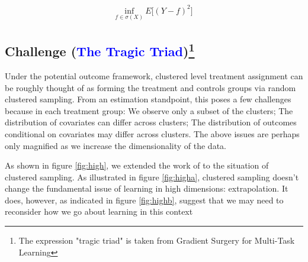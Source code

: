 \documentclass[a4paper,12pt]{article}
\begin{document}
\begin{align*}
    \underset{f \in \sigma(X)}{\text{inf}} \ E\big[(Y - f)^2\big]
\end{align*}
 

\subsection{Challenge (\textcolor{blue}{The Tragic Triad})\footnote{The expression "tragic triad" is taken from Gradient Surgery for Multi-Task Learning}}
Under the potential outcome framework, clustered level treatment assignment can be roughly thought of as forming the treatment and controls groups via random clustered sampling. From an estimation standpoint, this poses a few challenges because in each treatment group: We observe only a subset of the clusters; The distribution of covariates can differ across clusters; The distribution of outcomes conditional on covariates may differ across clusters. The above issues are perhaps only magnified as we increase the dimensionality of the data.\par 
As shown in figure \ref{fig:high}, we extended the work of \cite{balestriero2021learning} to the situation of clustered sampling. As illustrated in figure \ref{fig:higha}, clustered sampling doesn't change the fundamental issue of learning in high dimensions: extrapolation. It does, however, as indicated in figure \ref{fig:highb}, suggest that we may need to reconsider how we go about learning in this context
\end{document}
